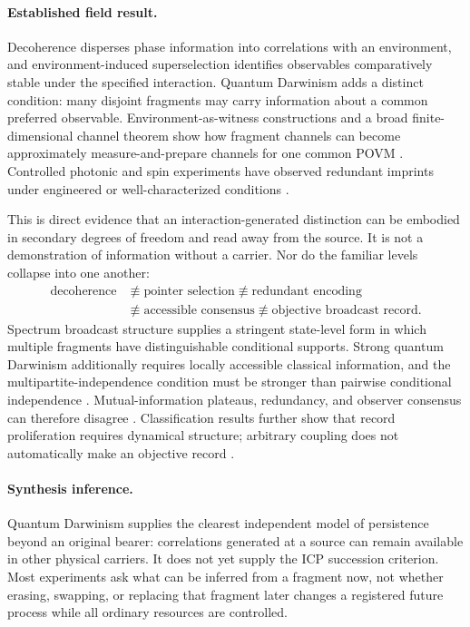 \paragraph{Established field result.}
Decoherence disperses phase information into correlations with an environment,
and environment-induced superselection identifies observables comparatively
stable under the specified interaction.  Quantum Darwinism adds a distinct
condition: many disjoint fragments may carry information about a common
preferred observable.  Environment-as-witness constructions and a broad
finite-dimensional channel theorem show how fragment channels can become
approximately measure-and-prepare channels for one common POVM
\citep{OllivierPoulinZurek2004Witness,
BrandaoEtAl2015Darwinism}.  Controlled photonic and spin experiments
have observed redundant imprints under engineered or well-characterized
conditions \citep{CiampiniEtAl2018DarwinismExperiment,ChenEtAl2019DarwinismExperiment,
UndenEtAl2019Classicality}.

This is direct evidence that an interaction-generated distinction can be
embodied in secondary degrees of freedom and read away from the source.  It is
not a demonstration of information without a carrier.  Nor do the familiar
levels collapse into one another:
\begin{equation}
 \begin{aligned}
 \text{decoherence}&\not\equiv\text{pointer selection}
 \not\equiv\text{redundant encoding}\\
 &\not\equiv\text{accessible consensus}
 \not\equiv\text{objective broadcast record}.
 \end{aligned}
 \label{eq:objectivity-ladder}
\end{equation}
Spectrum broadcast structure supplies a stringent state-level form in which
multiple fragments have distinguishable conditional supports.  Strong quantum
Darwinism additionally requires locally accessible classical information, and
the multipartite-independence condition must be stronger than pairwise
conditional independence \citep{HorodeckiEtAl2015Objectivity,
LeOlayaCastro2018Objectivity,FellerEtAl2021CommentDarwinism}.  Mutual-information
plateaus, redundancy, and observer consensus can therefore disagree
\citep{ChisholmEtAl2023RedundancyConsensus}.  Classification results further show that
record proliferation requires dynamical structure; arbitrary coupling does not
automatically make an objective record \citep{DoucetDeffner2024DarwinismHamiltonians}.

\paragraph{Synthesis inference.}
Quantum Darwinism supplies the clearest independent model of persistence beyond
an original bearer: correlations generated at a source can remain available in
other physical carriers.  It does not yet supply the ICP succession criterion.
Most experiments ask what can be inferred from a fragment now, not whether
erasing, swapping, or replacing that fragment later changes a registered
future process while all ordinary resources are controlled.

